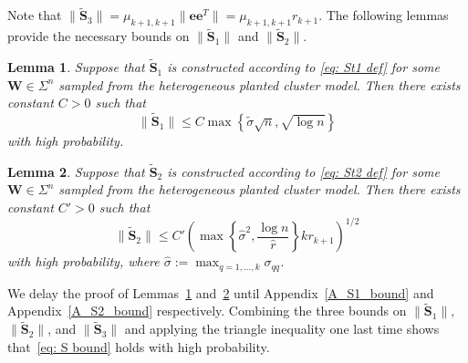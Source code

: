 \documentclass[twoside,11pt]{article}
\newtheorem{lemma}{Lemma}[section]
\newcommand{\St}{\bs{\tilde S}}
\newcommand{\bs}{\boldsymbol}
\newcommand{\W}{\bs {W}}
\newcommand{\0}{\bs{0}}
\newcommand{\rbra}[1]{\ensuremath{\left( #1 \right)}} %
\newcommand{\bra}[1]{\ensuremath{\left\{ #1 \right\}}} %
\begin{document}
{Note that $\|\St_3\| = \mu_{k+1, k+1}\|\bs{e}\bs{e}^T\|=\mu_{k+1, k+1} r_{k+1}$.
The following lemmas provide the necessary bounds on $\|\St_1\|$ and $\|\St_2\|$.

\begin{lemma} \label{lem: S1}
	Suppose that \(\St_1\) is constructed according to \eqref{eq: St1 def}
	for some \(\W\in \Sigma^n\) sampled from the heterogeneous planted cluster model.
	Then there exists constant $C > 0$ such that
	\begin{equation} \label{eq: S1 bound}
	\|\St_1\| \le C   \max  \bra {\tilde \sigma\sqrt{n},  \sqrt{\log n}}
	\end{equation}
	with high probability.
\end{lemma}

\begin{lemma} \label{lem: S2}
	Suppose that \(\St_2\) is constructed according to \eqref{eq: St2 def}
	for some \(\W\in \Sigma^n\) sampled from the heterogeneous planted cluster model.
	Then there exists constant $C'> 0$ such that
	\begin{equation} \label{eq: S2 bound}
		\|\St_2 \| \le C' \rbra{ \max \bra{\hat\sigma^2, \frac{\log n}{\hat r} } k r_{k+1} }^{1/2}
	\end{equation}
	with high probability, where $\hat \sigma := \max_{q=1,\dots, k} \sigma_{qq}$.
\end{lemma}

We delay the proof of Lemmas~\ref{lem: S1} and~\ref{lem: S2} until Appendix~\ref{A_S1_bound}
and Appendix~\ref{A_S2_bound} respectively.
Combining the three bounds on \(\|\St_1\|,\) \(\|\St_2\|\), and \(\|\St_3\|\) and
applying the triangle inequality one last time shows that~\eqref{eq: S bound} holds
with high probability.


}
\end{document}
